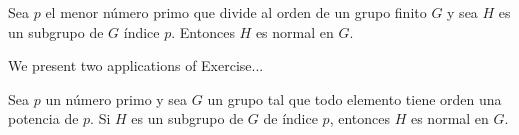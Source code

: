 \begin{exercise}
\label{xca:p_menor}
        Sea $p$ el menor número primo que divide al orden de un grupo finito
        $G$ y sea $H$ es un subgrupo de $G$ índice $p$. Entonces $H$ es normal en $G$.
\end{exercise}


We present two applications of Exercise...

\begin{exercise}
Sea $p$ un número primo y sea $G$ un grupo tal que todo elemento tiene orden una potencia de $p$. Si
$H$ es un subgrupo de $G$ de índice $p$, entonces $H$ es normal en $G$.
\end{exercise}